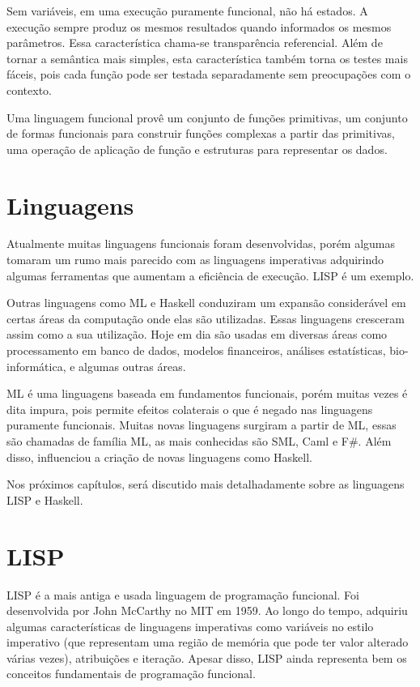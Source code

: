 \documentclass[a4paper, twoside, 12pt]{article}
\begin{document}
Sem variáveis, em uma execução puramente funcional, não há estados. A execução sempre produz os mesmos resultados quando informados os mesmos parâmetros. Essa característica chama-se transparência referencial. Além de tornar a semântica mais simples, esta característica também torna os testes mais fáceis, pois cada função pode ser testada separadamente sem preocupações com o contexto.

Uma linguagem funcional provê um conjunto de funções primitivas, um conjunto de formas funcionais para construir funções complexas a partir das primitivas, uma operação de aplicação de função e estruturas para representar os dados.

\clearpage
\section{Linguagens \label{sec:linguagens}}

Atualmente muitas linguagens funcionais foram desenvolvidas, porém algumas tomaram um rumo mais parecido com as linguagens imperativas adquirindo algumas ferramentas que aumentam a eficiência de execução. LISP é um exemplo.

Outras linguagens como ML e Haskell conduziram um expansão considerável em certas áreas da computação onde elas são utilizadas. Essas linguagens cresceram assim como a sua utilização. Hoje em dia são usadas em diversas áreas como processamento em banco de dados, modelos financeiros, análises estatísticas, bio-informática, e algumas outras áreas.

ML é uma linguagens baseada em fundamentos funcionais, porém muitas vezes é dita impura, pois permite efeitos colaterais o que é negado nas linguagens puramente funcionais. Muitas novas linguagens surgiram a partir de ML, essas são chamadas de família ML, as mais conhecidas são SML, Caml e F\#. Além disso, influenciou a criação de novas linguagens como Haskell.

Nos próximos capítulos, será discutido mais detalhadamente sobre as linguagens LISP e Haskell.

\section{LISP \label{sec:lisp}}

LISP é a mais antiga e usada linguagem de programação funcional. Foi desenvolvida por John McCarthy no MIT em 1959. Ao longo do tempo, adquiriu algumas características de linguagens imperativas como variáveis no estilo imperativo (que representam uma região de memória que pode ter valor alterado várias vezes), atribuições e iteração. Apesar disso, LISP ainda representa bem os conceitos fundamentais de programação funcional.
\end{document}
